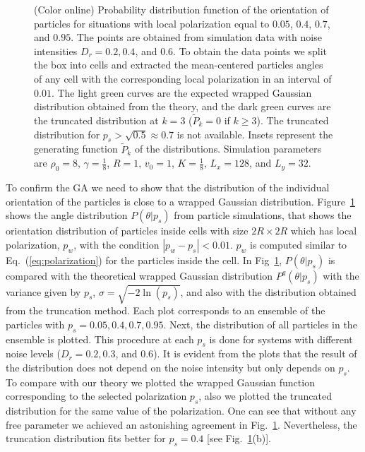 \documentclass[reprint,floatfix,amsmath,amssymb,aps,pre,showkeys,showpacs,superscriptaddress]{revtex4-1}
\newcommand{\p}{p}
\newcommand{\req}[1]{Eq.~(\ref{#1})}
\begin{document}
\begin{figure}
\caption{(Color online) Probability distribution function of the orientation of particles for situations with local polarization equal to  $0.05$,  $0.4$,  $0.7$, and  $0.95$. The points are obtained from simulation data with noise intensities $D_r=0.2,0.4$, and $0.6$. To obtain the data points we split the box into cells and extracted the mean-centered particles angles of any cell with the corresponding local polarization in an interval of $0.01$. The light green curves are the expected wrapped Gaussian distribution obtained from the theory, and the dark green curves are the truncated distribution at $k=3$ ($\tilde{P}_k = 0$ if $k \ge 3$). The truncated distribution for $p_s > \sqrt{0.5} \approx 0.7$ is not available. Insets represent the generating function $\tilde{P}_k$ of the distributions. Simulation parameters are $\rho_0=8$, $\gamma = \frac{1}{8}$, $R=1$, $v_0=1$, $K=\frac{1}{8}$, $L_x=128$, and $L_y=32$.}
	\label{fig:f-alignment-distribution}
\end{figure}

To confirm the GA we need to show that the distribution of the individual orientation of the particles is close to a wrapped Gaussian distribution. Figure~\ref{fig:f-alignment-distribution} shows the angle distribution $P(\theta|\p_s)$ from particle simulations, that shows the orientation distribution of particles inside cells with size $2R\times 2R$ which has local polarization, $\p_w$, with the condition $|\p_w - \p_s| < 0.01$. $\p_w$ is computed similar to \req{eq:polarization} for the particles inside the cell. In Fig~\ref{fig:f-alignment-distribution}, $P(\theta|\p_s)$ is compared with the theoretical wrapped Gaussian distribution $P^g(\theta|\p_s)$ with the variance given by $\p_s$, $\sigma= \sqrt{-2 \ln(\p_s)}$, and also with the distribution obtained from the truncation method. Each plot corresponds to an ensemble of the particles with $\p_s=0.05,0.4,0.7,0.95$. Next, the distribution of all particles in the ensemble is plotted. This procedure at each $\p_s$ is done for systems with different noise levels ($D_r=0.2,0.3$, and $0.6$). It is evident from the plots that the result of the distribution does not depend on the noise intensity but only depends on $\p_s$. To compare with our theory we plotted the wrapped Gaussian function corresponding to the selected polarization $\p_s$, also we plotted the truncated distribution for the same value of the polarization. One can see that without any free parameter we achieved an astonishing agreement in Fig.~\ref{fig:f-alignment-distribution}. Nevertheless, the truncation distribution fits better for $\p_s=0.4$ [see Fig.~\ref{fig:f-alignment-distribution}(b)].
\end{document}
